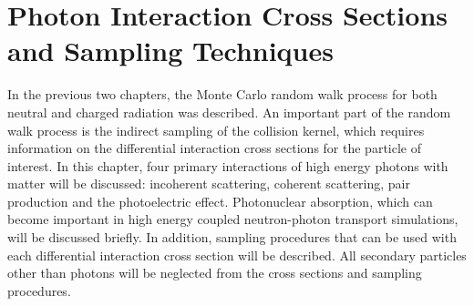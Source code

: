 \chapter{Photon Interaction Cross Sections and Sampling Techniques}
\label{ch:photon_interactions}
In the previous two chapters, the Monte Carlo random walk process for both
neutral and charged radiation was described. An important part of the random
walk process is the indirect sampling of the collision kernel, which requires
information on the differential interaction cross sections for the particle
of interest. In this chapter, four primary interactions of high energy photons 
with matter will be discussed: incoherent scattering, coherent scattering, 
pair production and the photoelectric effect. Photonuclear absorption, which can
become important in high energy coupled neutron-photon transport simulations, 
will be discussed briefly. In addition, sampling procedures that can be used 
with each differential interaction cross section will be described. All 
secondary particles other than photons will be neglected from the cross sections
and sampling procedures. 

